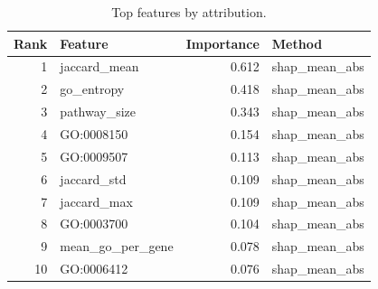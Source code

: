 \begin{table}[htbp]
\centering
\caption{Top features by attribution.}
\label{tab:top_features_recomputed}
\begin{tabular}{rlrl}
\toprule
Rank & Feature & Importance & Method \\
\midrule
1 & jaccard\_mean & 0.612 & shap\_mean\_abs \\
2 & go\_entropy & 0.418 & shap\_mean\_abs \\
3 & pathway\_size & 0.343 & shap\_mean\_abs \\
4 & GO:0008150 & 0.154 & shap\_mean\_abs \\
5 & GO:0009507 & 0.113 & shap\_mean\_abs \\
6 & jaccard\_std & 0.109 & shap\_mean\_abs \\
7 & jaccard\_max & 0.109 & shap\_mean\_abs \\
8 & GO:0003700 & 0.104 & shap\_mean\_abs \\
9 & mean\_go\_per\_gene & 0.078 & shap\_mean\_abs \\
10 & GO:0006412 & 0.076 & shap\_mean\_abs \\
\bottomrule
\end{tabular}

\end{table}
